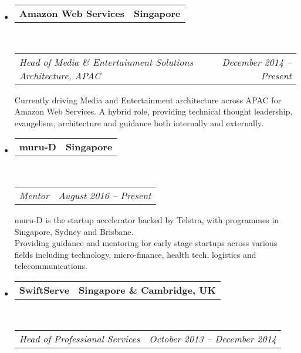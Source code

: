 \documentclass[10pt,a4paper]{article}
\makeatletter
\newcommand{\headerrow}[2]
{\begin{tabular*}{\linewidth}{l@{\extracolsep{\fill}}r}
    #1 &
    #2 \\
\end{tabular*}}
\makeatother
\begin{document}
\begin{itemize}
    \parskip=0.1em

    \item
        \headerrow
            {\textbf{Amazon Web Services}}
            {\textbf{Singapore}}
        \\
        \headerrow
            {\emph{Head of Media \& Entertainment Solutions Architecture, APAC}}
            {\emph{December 2014 -- Present}}
            
            Currently driving Media and Entertainment architecture across APAC for Amazon Web Services. A hybrid role, providing technical thought leadership, evangelism, architecture and guidance both internally and externally.  
            

    \item
        \headerrow
            {\textbf{muru-D}}
            {\textbf{Singapore}}
        \\
        \headerrow
            {\emph{Mentor}}
            {\emph{August 2016 -- Present}}

            muru-D is the startup accelerator backed by Telstra, with programmes in Singapore, Sydney and Brisbane.
            \\
            Providing guidance and mentoring for early stage startups across various fields including technology, micro-finance, health tech, logistics and telecommunications.

    \item
        \headerrow
            {\textbf{SwiftServe}}
            {\textbf{Singapore \& Cambridge, UK}}
        \\
        \headerrow
            {\emph{Head of Professional Services}}
            {\emph{October 2013 -- December 2014}}
    

\end{itemize}
\end{document}
